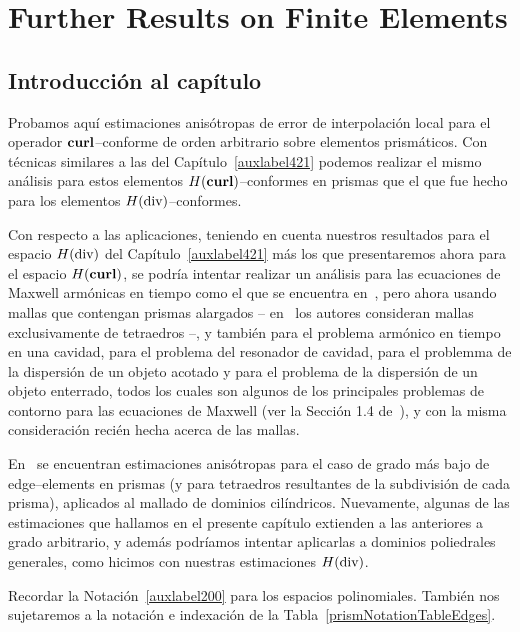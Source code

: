 \chapter{Further Results on Finite Elements}
\label{auxlabel202}
\section*{Introducci\'on al cap\'itulo}

Probamos aqu\'i estimaciones anis\'otropas de error de interpolaci\'on local
para el operador $\textbf{curl}$--conforme de orden arbitrario sobre elementos
prism\'aticos. 
Con t\'ecnicas similares a las del Cap\'itulo~\ref{auxlabel421}
podemos realizar el mismo 
an\'alisis para estos elementos $H(\textbf{curl})$--conformes en prismas
que el que fue hecho para los elementos $H(\operatorname{\textrm{div}})$--conformes.

Con respecto a las aplicaciones, 
teniendo en cuenta nuestros resultados para el espacio $H(\operatorname{\textrm{div}})$ 
del Cap\'itulo~\ref{auxlabel421} m\'as los que presentaremos
ahora para el espacio $H(\textbf{curl})$, se podr\'ia intentar realizar
un an\'alisis para las ecuaciones de Maxwell arm\'onicas en tiempo
como el que se encuentra en~\cite{buffaCostabelDauge}, pero
ahora usando mallas que contengan prismas alargados 
-- en~\cite{buffaCostabelDauge} los autores consideran
mallas exclusivamente de tetraedros --, y tambi\'en 
para el problema arm\'onico en tiempo en una cavidad,
para el problema del resonador de cavidad, para el problemma
de la dispersi\'on de un objeto acotado y para el problema
de la dispersi\'on de un objeto enterrado, todos los cuales
son algunos de los principales problemas de contorno
para las ecuaciones de Maxwell
(ver la Secci\'on 1.4 de~\cite{monk}), 
y con la misma consideraci\'on
reci\'en hecha acerca de las mallas.

En~\cite{MR1860445} se encuentran estimaciones anis\'otropas
para el caso de grado m\'as bajo de edge--elements en prismas
(y para tetraedros resultantes de la subdivisi\'on de cada prisma),
aplicados al mallado de dominios cil\'indricos.
Nuevamente, algunas de las estimaciones que hallamos 
en el presente cap\'itulo extienden a las anteriores a grado arbitrario,
y adem\'as podr\'iamos intentar aplicarlas a dominios poliedrales 
generales, como hicimos con nuestras estimaciones $H(\operatorname{\textrm{div}})$.

Recordar la Notaci\'on~\ref{auxlabel200} para los espacios polinomiales. 
Tambi\'en nos sujetaremos a la notaci\'on e indexaci\'on de la  
Tabla~\ref{prismNotationTableEdges}.

